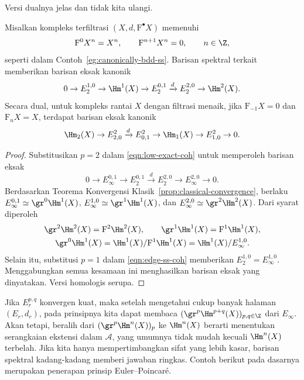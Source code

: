 Versi dualnya jelas dan tidak kita ulangi.

\begin{corollary}
\label{prop:low-degree-ss}
	Misalkan kompleks terfiltrasi $(X,d,\mathrm{F}^\bullet X)$ memenuhi
	\[ \mathrm{F}^0X^n=X^n,\qquad \mathrm{F}^{n+1}X^n=0,
	\qquad n\in\Z, \]
	seperti dalam Contoh~\ref{eg:canonically-bdd-ss}. Barisan spektral terkait
	memberikan barisan eksak kanonik
	\[ 0\to E_2^{1,0}\to\Hm^1(X)\to E_2^{0,1}\xrightarrow{d}E_2^{2,0}
	\to\Hm^2(X). \]
	Secara dual, untuk kompleks rantai $X$ dengan filtrasi menaik, jika
	$\mathrm{F}_{-1}X=0$ dan $\mathrm{F}_nX=X$, terdapat barisan eksak kanonik
	\[ \Hm_2(X)\to E^2_{2,0}\xrightarrow{d}E^2_{0,1}\to\Hm_1(X)
	\to E^2_{1,0}\to0. \]
\end{corollary}
\begin{proof}
	Substitusikan $p=2$ dalam \eqref{eqn:low-exact-coh} untuk memperoleh
	barisan eksak
	\[ 0\to E_\infty^{0,1}\to E_2^{0,1}\xrightarrow{d}E_2^{2,0}
	\to E_\infty^{2,0}\to0. \]
	Berdasarkan Teorema Konvergensi Klasik~\ref{prop:classical-convergence},
	berlaku $E_\infty^{0,1}\simeq\gr^0\Hm^1(X)$,
	$E_\infty^{1,0}\simeq\gr^1\Hm^1(X)$, dan
	$E_\infty^{2,0}\simeq\gr^2\Hm^2(X)$. Dari syarat diperoleh
	\begin{gather*}
		\gr^2\Hm^2(X)=\mathrm{F}^2\Hm^2(X),\qquad
		\gr^1\Hm^1(X)=\mathrm{F}^1\Hm^1(X),\\
		\gr^0\Hm^1(X)=\Hm^1(X)/\mathrm{F}^1\Hm^1(X)
		=\Hm^1(X)/E_\infty^{1,0}.
	\end{gather*}
	Selain itu, substitusi $p=1$ dalam \eqref{eqn:edge-ss-coh} memberikan
	$E_2^{1,0}=E_\infty^{1,0}$. Menggabungkan semua kesamaan ini menghasilkan
	barisan eksak yang dinyatakan. Versi homologis serupa.
\end{proof}

Jika $E_r^{p,q}$ konvergen kuat, maka setelah mengetahui cukup banyak halaman
$(E_r,d_r)$, pada prinsipnya kita dapat membaca
$(\gr^p\Hm^{p+q}(X))_{p,q\in\Z}$ dari $E_\infty$. Akan tetapi, beralih dari
$(\gr^p\Hm^n(X))_p$ ke $\Hm^n(X)$ berarti menentukan serangkaian ekstensi
dalam $\mathcal{A}$, yang umumnya tidak mudah kecuali $\Hm^n(X)$ terbelah.
Jika kita hanya mempertimbangkan sifat yang lebih kasar, barisan spektral
kadang-kadang memberi jawaban ringkas. Contoh berikut pada dasarnya merupakan
penerapan prinsip Euler--Poincar\'e.

